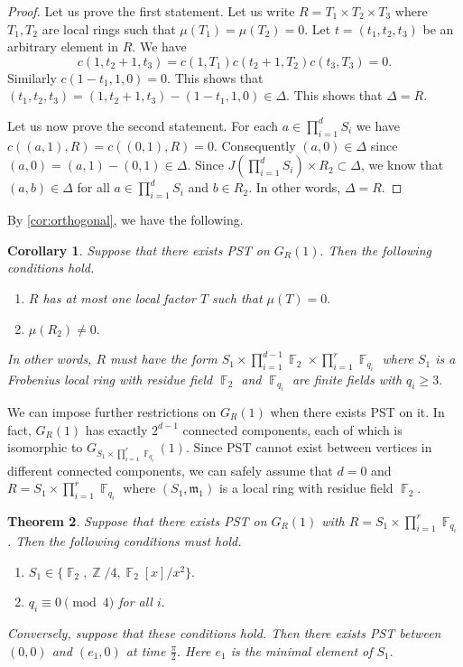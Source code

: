 \documentclass[12pt, a4paper]{amsart}
\newtheorem{thm}{Theorem}[section]
\newtheorem{cor}[thm]{Corollary}
\theoremstyle{definition}
\DeclareMathOperator{\Z}{\mathbb{Z}}
\DeclareMathOperator{\F}{\mathbb{F}}
\numberwithin{equation}{section}
\begin{document}
\begin{proof}
Let us prove the first statement. Let us write $R=T_1 \times T_2 \times T_3$ where $T_1, T_2$ are local rings such that $\mu(T_1)=\mu(T_2)=0.$ Let $t=(t_1, t_2, t_3)$ be an arbitrary element in $R.$ We have 
\[ c(1, t_2+1, t_3) = c(1, T_1) c(t_2+1, T_2) c(t_3, T_3)=0.\]
Similarly $c(1-t_1, 1, 0)=0.$ This shows that $(t_1, t_2, t_3)=(1, t_2+1, t_3)-(1-t_1, 1, 0) \in \Delta.$ This shows that $\Delta = R.$

Let us now prove the second statement. For each $a \in \prod_{i=1}^d S_i$ we have $c((a, 1),R)=c((0,1),R)=0.$ Consequently $(a,0) \in \Delta$ since $(a,0) =(a,1)-(0,1) \in \Delta$. Since $J(\prod_{i=1}^d S_i) \times R_2 \subset \Delta$, we know that $(a,b) \in \Delta$ for all $a \in \prod_{i=1}^d S_i$ and $b \in R_2.$ In other words, $\Delta = R.$
    \end{proof}
By \cref{cor:orthogonal}, we have the following. 
\begin{cor}
Suppose that there exists PST on $G_{R}(1).$ Then the following conditions hold. 
\begin{enumerate}
    \item $R$ has at most one local factor $T$ such that $\mu(T)=0.$
    \item $\mu(R_2) \neq 0.$
\end{enumerate}
In other words, $R$ must have the form $S_1 \times \prod_{i=1}^{d-1} \F_2 \times \prod_{i=1}^r \F_{q_i} $ where $S_1$ is a Frobenius local ring with residue field $\F_2$ and $\F_{q_i}$ are finite fields with $q_i \geq 3.$
\end{cor}

We can impose further restrictions on $G_{R}(1)$ when there exists PST on it. In fact, $G_{R}(1)$ has exactly $2^{d-1}$ connected components, each of which is isomorphic to $G_{S_1 \times \prod_{i=1}^r \F_{q_i} }(1).$ Since PST cannot exist between vertices in different connected components, we can safely assume that $d=0$ and $R=S_1 \times \prod_{i=1}^{r} \F_{q_i}$ where $(S_1, \mathfrak{m}_1)$ is a local ring with residue field $\F_2.$


\begin{thm} \label{thm:unitary}
    Suppose that there exists PST on $G_{R}(1)$ with $R=S_1 \times \prod_{i=1}^r \F_{q_i}$. Then the following conditions must hold. 
\begin{enumerate}
    \item $S_1 \in \{\F_2, \Z/4, \F_2[x]/x^2 \}.$
    \item $q_i \equiv 0 \pmod{4}$ for all $i.$
\end{enumerate}
Conversely, suppose that these conditions hold. Then there exists PST between $(0,0)$ and $(e_1, 0)$ at time $\frac{\pi}{2}.$ Here $e_1$ is the minimal element of $S_1.$
\end{thm}
\end{document}
